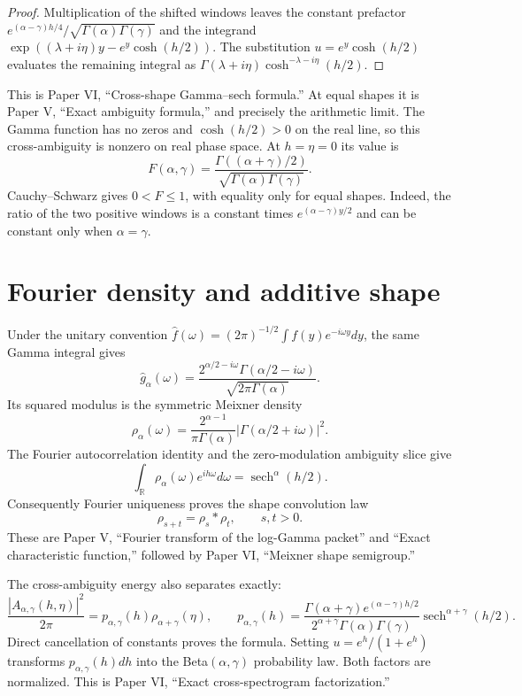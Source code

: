 \begin{proof}
Multiplication of the shifted windows leaves the constant prefactor
$e^{(\alpha-\gamma)h/4}/\sqrt{\Gamma(\alpha)\Gamma(\gamma)}$
and the integrand
$\exp((\lambda+i\eta)y-e^y\cosh(h/2))$.
The substitution $u=e^y\cosh(h/2)$ evaluates the remaining integral as
$\Gamma(\lambda+i\eta)\cosh^{-\lambda-i\eta}(h/2)$.
\end{proof}

This is Paper VI, ``Cross-shape Gamma--sech formula.'' At equal shapes it is
Paper V, ``Exact ambiguity formula,'' and precisely the arithmetic limit.
The Gamma function has no zeros and $\cosh(h/2)>0$ on the real line, so this
cross-ambiguity is nonzero on real phase space. At $h=\eta=0$ its value is
\[
 F(\alpha,\gamma)=
 \frac{\Gamma((\alpha+\gamma)/2)}{\sqrt{\Gamma(\alpha)\Gamma(\gamma)}}.
\]
Cauchy--Schwarz gives $0<F\leq1$, with equality only for equal shapes.
Indeed, the ratio of the two positive windows is a constant times
$e^{(\alpha-\gamma)y/2}$ and can be constant only when $\alpha=\gamma$.

\section{Fourier density and additive shape}

Under the unitary convention
$\widehat f(\omega)=(2\pi)^{-1/2}\int f(y)e^{-i\omega y}dy$, the same
Gamma integral gives
\[
 \widehat g_\alpha(\omega)=
 \frac{2^{\alpha/2-i\omega}\Gamma(\alpha/2-i\omega)}
 {\sqrt{2\pi\Gamma(\alpha)}}.
\]
Its squared modulus is the symmetric Meixner density
\[
 \rho_\alpha(\omega)=
 \frac{2^{\alpha-1}}{\pi\Gamma(\alpha)}
 |\Gamma(\alpha/2+i\omega)|^2.
\]
The Fourier autocorrelation identity and the zero-modulation ambiguity slice
give
\[
 \int_{\mathbb R}\rho_\alpha(\omega)e^{ih\omega}d\omega
 =\operatorname{sech}^{\alpha}(h/2).
\]
Consequently Fourier uniqueness proves the shape convolution law
\[
 \rho_{s+t}=\rho_s*\rho_t,\qquad s,t>0.
\]
These are Paper V, ``Fourier transform of the log-Gamma packet'' and ``Exact
characteristic function,'' followed by Paper VI, ``Meixner shape semigroup.''

The cross-ambiguity energy also separates exactly:
\begin{equation}
 \frac{|A_{\alpha,\gamma}(h,\eta)|^2}{2\pi}
 =p_{\alpha,\gamma}(h)\rho_{\alpha+\gamma}(\eta),
 \qquad
 p_{\alpha,\gamma}(h)=
 \frac{\Gamma(\alpha+\gamma)e^{(\alpha-\gamma)h/2}}
 {2^{\alpha+\gamma}\Gamma(\alpha)\Gamma(\gamma)}
 \operatorname{sech}^{\alpha+\gamma}(h/2).
 \label{eq:shape-factorization}
\end{equation}
Direct cancellation of constants proves the formula. Setting
$u=e^h/(1+e^h)$ transforms $p_{\alpha,\gamma}(h)dh$ into the
Beta$(\alpha,\gamma)$ probability law. Both factors are normalized. This is
Paper VI, ``Exact cross-spectrogram factorization.''

